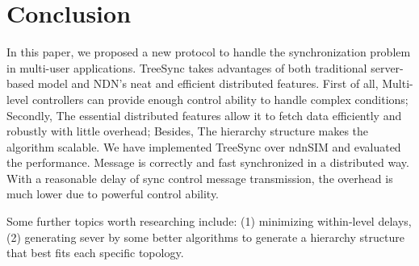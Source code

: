 \documentclass[conference]{IEEEtran}
\begin{document}
\section{Conclusion}
\label{conclusion}
In this paper, we proposed a new protocol to handle the synchronization problem in multi-user applications.
TreeSync takes advantages of both traditional server-based model and NDN's neat and efficient distributed features.
First of all, Multi-level controllers can provide enough control ability to handle complex conditions;
Secondly, The essential distributed features allow it to fetch data efficiently and robustly with little overhead;
Besides, The hierarchy structure makes the algorithm scalable.
We have implemented TreeSync over ndnSIM and evaluated the performance.
Message is correctly and fast synchronized in a distributed way.
With a reasonable delay of sync control message transmission,
the overhead is much lower due to powerful control ability.

Some further topics worth researching include:
(1) minimizing within-level delays,
(2) generating sever by some better algorithms to generate a hierarchy structure
that best fits each specific topology.
\end{document}
